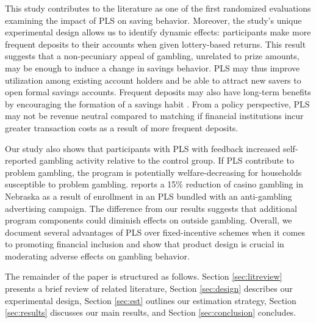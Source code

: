 \documentclass[12pt]{article}
\begin{document}

	This study contributes to the literature as one of the first randomized evaluations examining the impact of PLS on saving behavior. Moreover, the study's unique experimental design allows us to identify dynamic effects: participants make more frequent deposits to their accounts when given lottery-based returns. This result suggests that a non-pecuniary appeal of gambling, unrelated to prize amounts, may be enough to induce a change in savings behavior. PLS may thus improve utilization among existing account holders and be able to attract new savers to open formal savings accounts. Frequent deposits may also have long-term benefits by encouraging the formation of a savings habit . From a policy perspective, PLS may not be revenue neutral compared to matching if financial institutions incur greater transaction costs as a result of more frequent deposits.


	Our study also shows that participants with PLS with feedback increased self-reported gambling activity relative to the control group. If PLS contribute to problem gambling, the program is potentially welfare-decreasing for households susceptible to problem gambling.  reports a 15\% reduction of casino gambling in Nebraska as a result of enrollment in an PLS bundled with an anti-gambling advertising campaign. The difference from our results suggests that additional program components could diminish effects on outside gambling. Overall, we document several advantages of PLS over fixed-incentive schemes when it comes to promoting financial inclusion and show that product design is crucial in moderating adverse effects on gambling behavior.


	The remainder of the paper is structured as follows. Section \ref{sec:litreview} presents a brief review of related literature, Section \ref{sec:design} describes our experimental design, Section \ref{sec:est} outlines our estimation strategy, Section \ref{sec:results} discusses our main results, and Section \ref{sec:conclusion} concludes.
\end{document}
